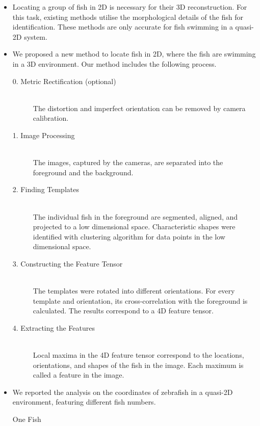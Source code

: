 \documentclass[11pt,twoside]{report}
\begin{document}
\begin{adjustwidth}{0cm}{-5cm}
\begin{tcolorbox}[
fonttitle=\sffamily\Large,
right=0.1\linewidth,
top=5mm,
bottom=5mm,
title=Summary of Chapter~3,
]

\begin{itemize}
	\item Locating a group of fish in 2D is necessary for their 3D reconstruction. For this task, existing methods utilise the morphological details of the fish for identification. These methods are only accurate for fish swimming in a quasi-2D system.
	\item We proposed a new method to locate fish in 2D, where the fish are swimming in a 3D environment. Our method includes the following process.
	\begin{description}
		\item[0. Metric Rectification (optional)] \hfill \\ 
		The distortion and imperfect orientation can be removed by camera calibration.
		\item[1. Image Processing] \hfill \\ 
		The images, captured by the cameras, are separated into the foreground and the background.
		\item[2. Finding Templates] \hfill \\ 
		The individual fish in the foreground are segmented, aligned, and projected to a low dimensional space. Characteristic shapes were identified with clustering algorithm for data points in the low dimensional space.
		\item[3. Constructing the Feature Tensor] \hfill \\ 
		The templates were rotated into different orientations. For every template and orientation, its cross-correlation with the foreground is calculated. The results correspond to a 4D feature tensor.
		\item[4. Extracting the Features] \hfill \\ 
		Local maxima in the 4D feature tensor correspond to the locations, orientations, and shapes of the fish in the image. Each maximum is called a feature in the image.
	\end{description}
	\item We reported the analysis on the coordinates of zebrafish in a quasi-2D environment, featuring different fish numbers.
	\begin{description}
		\item[One Fish] \hfill \\

\end{description}
\end{itemize}
\end{tcolorbox}
\end{adjustwidth}
\end{document}
